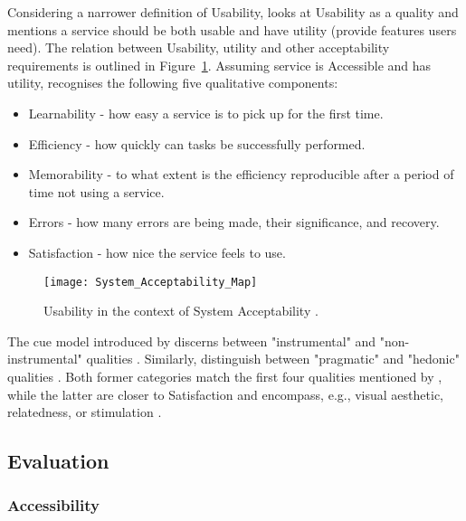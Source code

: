 Considering a narrower definition of Usability, \textcite{Nielsen_1993} looks at Usability as a quality and mentions a service should be both usable and have utility (provide features users need).
The relation between Usability, utility and other acceptability requirements is outlined in Figure~\ref{fig:system-acceptability}.
Assuming service is Accessible and has utility, \textcite{Nielsen_1993} recognises the following five qualitative components:

\begin{itemize}
    \item Learnability - how easy a service is to pick up for the first time.
    \item Efficiency - how quickly can tasks be successfully performed.
    \item Memorability - to what extent is the efficiency reproducible after a period of time not using a service.
    \item Errors - how many errors are being made, their significance, and recovery.
    \item Satisfaction - how nice the service feels to use.
\end{itemize}

\begin{figure}[ht]
    \centering
    \texttt{[image: System\_Acceptability\_Map]}
    \caption{Usability in the context of System Acceptability \parencite{Wilson_2009}.}
    \label{fig:system-acceptability}
\end{figure}

The \gls{cue} model introduced by \textcite{Thüring_Mahlke_2007} discerns between "instrumental" and "non-instrumental" qualities \parencite[p. 1209]{Juergen_et_all_2020}.
Similarly, \textcite{Hassenzahl_2008} distinguish between "pragmatic" and "hedonic" qualities \parencite[p. 1209]{Juergen_et_all_2020}.
Both former categories match the first four qualities mentioned by \textcite{Nielsen_1993}, while the latter are closer to Satisfaction and encompass, e.g., visual aesthetic, relatedness, or stimulation \parencite{Thüring_Mahlke_2007, Hassenzahl_2008}.

\subsection{Evaluation}
\label{Literature-HSIE-Evaluation}

\subsubsection{Accessibility}

